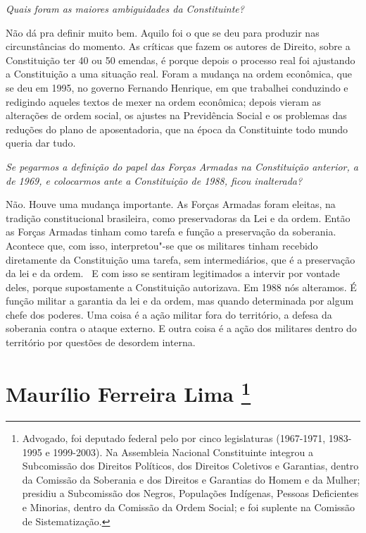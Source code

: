 \medskip

\noindent\emph{Quais foram as maiores ambiguidades da Constituinte?}

Não dá pra definir muito bem. Aquilo foi o que se deu
para produzir nas circunstâncias do momento. As críticas que fazem os
autores de Direito, sobre a Constituição ter 40 ou 50 emendas, é porque
depois o processo real foi ajustando a Constituição a uma situação real.
Foram a mudança na ordem econômica, que se deu em 1995, no governo
Fernando Henrique, em que trabalhei conduzindo e redigindo aqueles
textos de mexer na ordem econômica; depois vieram as alterações de ordem
social, os ajustes na Previdência Social e os problemas das reduções do
plano de aposentadoria, que na época da Constituinte todo mundo queria
dar tudo.

\medskip

\noindent\emph{Se pegarmos a definição do papel das Forças Armadas na Constituição
anterior, a de 1969, e colocarmos ante a Constituição de 1988, ficou
inalterada?}

Não. Houve uma mudança importante. As Forças Armadas
foram eleitas, na tradição constitucional brasileira, como preservadoras
da Lei e da ordem. Então as Forças Armadas tinham como tarefa e função a
preservação da soberania. Acontece que, com isso, interpretou"-se que os
militares tinham recebido diretamente da Constituição uma tarefa, sem
intermediários, que é a preservação da lei e da ordem.~ E com isso se
sentiram legitimados a intervir por vontade deles, porque supostamente a
Constituição autorizava. Em 1988 nós alteramos. É função militar a
garantia da lei e da ordem, mas quando determinada por algum chefe dos
poderes. Uma coisa é a ação militar fora do território, a defesa da
soberania contra o ataque externo. E outra coisa é a ação dos militares
dentro do território por questões de desordem interna.

\chapter{Maurílio Ferreira Lima
\footnote{Advogado, foi deputado federal pelo  por cinco legislaturas
(1967-1971, 1983-1995 e 1999-2003). Na Assembleia Nacional Constituinte
integrou a Subcomissão dos Direitos Políticos, dos Direitos Coletivos e
Garantias, dentro da Comissão da Soberania e dos Direitos e Garantias do
Homem e da Mulher; presidiu a Subcomissão dos Negros, Populações
Indígenas, Pessoas Deficientes e Minorias, dentro da Comissão da Ordem
Social; e foi suplente na Comissão de Sistematização.}}

